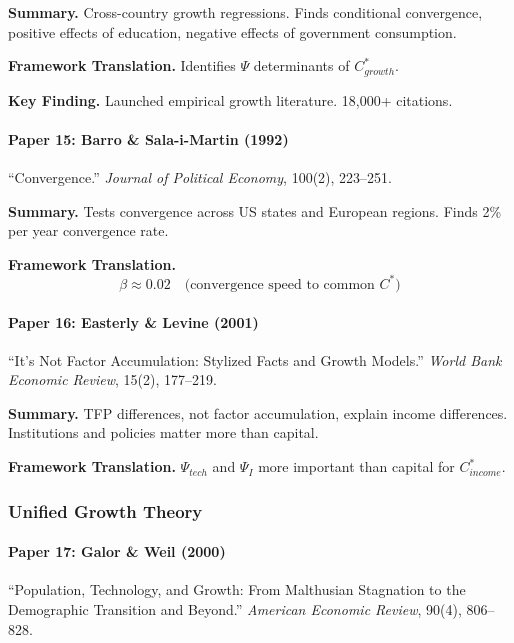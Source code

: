 \textbf{Summary.}
Cross-country growth regressions. Finds conditional convergence, positive 
effects of education, negative effects of government consumption.

\textbf{Framework Translation.}
Identifies $\Psi$ determinants of $C^*_{growth}$.

\textbf{Key Finding.}
Launched empirical growth literature. 18,000+ citations.

\paragraph{Paper 15: Barro \& Sala-i-Martin (1992)}

``Convergence.''
\textit{Journal of Political Economy}, 100(2), 223--251.

\textbf{Summary.}
Tests convergence across US states and European regions. Finds 2\% per year 
convergence rate.

\textbf{Framework Translation.}
\begin{equation}
\beta \approx 0.02 \quad \text{(convergence speed to common } C^*\text{)}
\end{equation}

\paragraph{Paper 16: Easterly \& Levine (2001)}

``It's Not Factor Accumulation: Stylized Facts and Growth Models.''
\textit{World Bank Economic Review}, 15(2), 177--219.

\textbf{Summary.}
TFP differences, not factor accumulation, explain income differences. 
Institutions and policies matter more than capital.

\textbf{Framework Translation.}
$\Psi_{tech}$ and $\Psi_I$ more important than capital for $C^*_{income}$.

\subsubsection{Unified Growth Theory}

\paragraph{Paper 17: Galor \& Weil (2000)}

``Population, Technology, and Growth: From Malthusian Stagnation to the 
Demographic Transition and Beyond.''
\textit{American Economic Review}, 90(4), 806--828.

